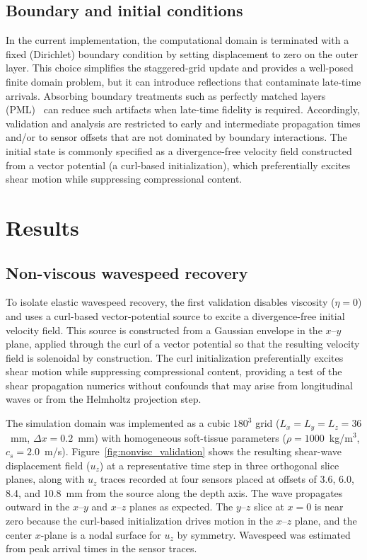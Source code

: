 \documentclass{iopjournal}
\begin{document}
\subsection{Boundary and initial conditions}
\label{sec:bc_ic}

In the current implementation, the computational domain is terminated with a
fixed (Dirichlet) boundary condition by setting displacement to zero on the
outer layer. This choice simplifies the staggered-grid update and provides a
well-posed finite domain problem, but it can introduce reflections that
contaminate late-time arrivals. Absorbing boundary treatments such as perfectly
matched layers
(PML)~\cite{berenger1994perfect,collino2001application} can reduce such
artifacts when late-time fidelity is required. Accordingly, validation and
analysis are restricted to early and intermediate propagation times and/or to
sensor offsets that are not dominated by boundary interactions. The initial
state is commonly specified as a divergence-free velocity field constructed from
a vector potential (a curl-based initialization), which preferentially excites
shear motion while suppressing compressional content.


\section{Results}
\label{sec:results}

\subsection{Non-viscous wavespeed recovery}
\label{sec:nonvisc_validation}

To isolate elastic wavespeed recovery, the first validation disables viscosity
($\eta=0$) and uses a curl-based vector-potential source to excite a
divergence-free initial velocity field. This source is constructed from a
Gaussian envelope in the $x$--$y$ plane, applied through the curl of a vector
potential so that the resulting velocity field is solenoidal by construction.
The curl initialization preferentially excites shear motion while suppressing
compressional content, providing a test of the shear propagation numerics
without confounds that may arise from longitudinal waves or from the Helmholtz projection
step.

The simulation domain was implemented as a cubic $180^3$ grid ($L_x=L_y=L_z=36$~mm,
$\Delta x=0.2$~mm) with homogeneous soft-tissue parameters
($\rho=1000$~kg/m$^3$, $c_s=2.0$~m/s). Figure~\ref{fig:nonvisc_validation} shows the resulting shear-wave
displacement field ($u_z$) at a representative time step in three orthogonal
slice planes, along with $u_z$ traces recorded at four sensors placed at
offsets of 3.6, 6.0, 8.4, and 10.8~mm from the source along the depth axis.
The wave propagates outward in the $x$--$y$ and $x$--$z$ planes as expected.
The $y$--$z$ slice at $x=0$ is near zero because the curl-based initialization
drives motion in the $x$--$z$ plane, and the center $x$-plane is a nodal surface
for $u_z$ by symmetry. Wavespeed was estimated from peak arrival times in the
sensor traces.
\end{document}
